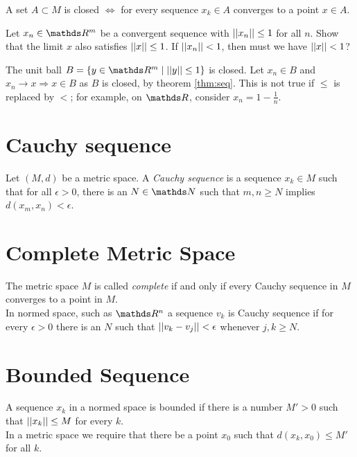 \documentclass[../main-sheet.tex]{subfiles}
\begin{document}
\begin{thm}
    A set $ A\subset M $ is closed $ \Leftrightarrow $ for every sequence $ x_k\in A $ converges to a point $ x\in A $.\label{thm:seq}
\end{thm}
\begin{ex}
    Let $ x_n \in \R^m $ be a convergent sequence with $ \left\vert\left\vert x_n\right\vert\right\vert\leq1 $ for all $ n $. Show that the limit $ x $ also satisfies $ \left\vert\left\vert x\right\vert\right\vert\leq1 $. If $ \left\vert\left\vert x_n\right\vert\right\vert<1 $, then must we have $ \left\vert\left\vert x\right\vert\right\vert<1 $? 
\end{ex}
\begin{soln}
    The unit ball $ B=\set{y\in \R^m\mid \norm{y}\leq 1} $ is closed. Let $ x_n\in B $ and $ x_n\to x \Rightarrow x\in B $ as $ B $ is closed, by theorem \ref{thm:seq}. This is not true if $ \leq $ is replaced by $ < $; for example, on $ \R $, consider $ x_n=1-\frac{1}{n} $.
\end{soln}
\section{Cauchy sequence}
Let $ (M,d) $ be a metric space. A \emph{Cauchy sequence} is a sequence $ x_k\in M $ such that for all $ \epsilon>0 $, there is an $ N\in\N $ such that $ m,n\geq N $ implies $ d(x_m,x_n)<\epsilon $.
\section{Complete Metric Space}
The metric space $ M $ is called \emph{complete} if and only if every Cauchy sequence in $ M $ converges to a point in $ M $.\\

In normed space, such as $ \R^n $ a sequence $ v_k $ is Cauchy sequence if for every $ \epsilon>0 $ there is an $ N $ such that $ \left\vert\left\vert v_k-v_j\right\vert\right\vert<\epsilon $ whenever $ j,k\geq N $.
\section{Bounded Sequence} 
A sequence $ x_k $ in a normed space is bounded if there is a number $ M'>0 $ such that $ \left\vert\left\vert x_k\right\vert\right\vert\leq M $ for every $ k $.\\

In a metric space we require that there be a point $ x_0 $ such that $ d(x_k,x_0)\leq M' $ for all $ k $.
\end{document}

